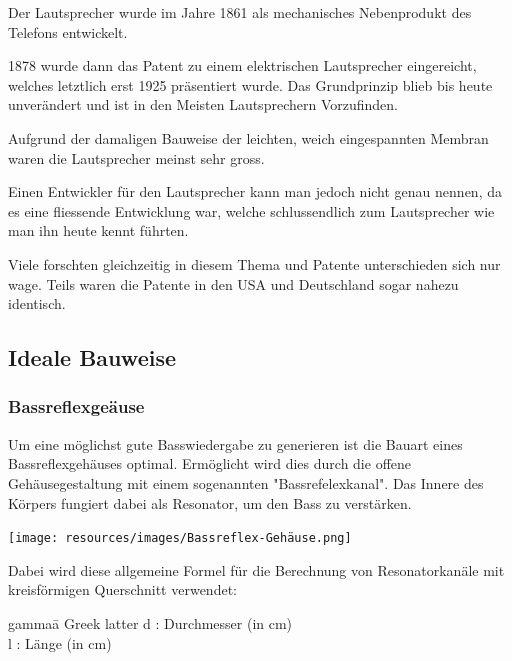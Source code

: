 \documentclass[a4paper,11pt]{report}
\begin{document}
Der Lautsprecher wurde im Jahre 1861 als mechanisches Nebenprodukt des Telefons entwickelt.

1878 wurde dann das Patent zu einem elektrischen Lautsprecher eingereicht, welches letztlich erst 1925 präsentiert wurde.
Das Grundprinzip blieb bis heute unverändert und ist in den Meisten Lautsprechern Vorzufinden. \cite{history_wikipedia}

Aufgrund der damaligen Bauweise der leichten, weich eingespannten Membran waren die Lautsprecher meinst sehr gross.\cite{history_connect}

Einen Entwickler für den Lautsprecher kann man jedoch nicht genau nennen, da es eine fliessende Entwicklung war, welche schlussendlich zum Lautsprecher wie man ihn heute kennt führten.

Viele forschten gleichzeitig in diesem Thema und Patente unterschieden sich nur wage. Teils waren die Patente in den USA und Deutschland sogar nahezu identisch.\cite{history_tu_berlin}

\newpage
\subsection{Ideale Bauweise}
\subsubsection*{Bassreflexgeäuse}
\vspace{.5cm}
\noindent \begin{minipage}{0.6\textwidth}
    Um eine möglichst gute Basswiedergabe zu generieren ist die Bauart eines Bassreflexgehäuses optimal. Ermöglicht wird dies durch die offene Gehäusegestaltung mit einem sogenannten "Bassrefelexkanal".
    Das Innere des Körpers fungiert dabei als Resonator, um den Bass zu verstärken.
\end{minipage}
\hspace{0.1\textwidth}
\begin{minipage}{0.2\textwidth}
    \texttt{[image: resources/images/Bassreflex-Gehäuse.png]}
    \label{fig:bass-reflex}
\end{minipage}
\vspace{.5cm}

Dabei wird diese allgemeine Formel für die Berechnung von Resonatorkanäle mit kreisförmigen Querschnitt verwendet:
\begin{tabbing}
    gamma\quad\= a Greek latter\kill
    d :    \>Durchmesser (in cm) \\
    l :    \>Länge (in cm)
\end{tabbing}
\end{document}
